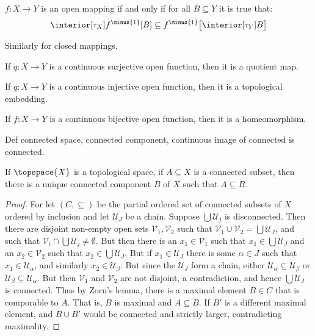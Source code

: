 \documentclass{article}                                                        %
\begin{document}
        \begin{theorem}
            $f:X\rightarrow{Y}$ is an open mapping if and only if for all
            $B\subseteq{Y}$ it is true that:
            \begin{equation}
                \interior[\tau_{X}]{f^{\minus{1}}[B]}\subseteq
                f^{\minus{1}}\big[\interior[\tau_{Y}]{B}\big]
            \end{equation}
        \end{theorem}
        Similarly for closed mappings.
        \begin{theorem}
            If $q:X\rightarrow{Y}$ is a continuous surjective open function,
            then it is a quotient map.
        \end{theorem}
        \begin{theorem}
            If $q:X\rightarrow{Y}$ is a continuous injective open function,
            then it is a topological embedding.
        \end{theorem}
        \begin{theorem}
            If $f:X\rightarrow{Y}$ is a continuous bijective open function,
            then it is a homeomorphism.
        \end{theorem}
        Def connected space, connected component, continuous image of connected
        is connected.
        \begin{theorem}
            If $\topspace{X}$ is a topological space, if $A\subseteq{X}$ is a
            connected subset, then there is a unique connected component
            $B$ of $X$ such that $A\subseteq{B}$.
        \end{theorem}
        \begin{proof}
            For let $(C,\subseteq)$ be the partial ordered set of connected
            subsets of $X$ ordered by inclusion and let $\mathcal{U}_{J}$ be a
            chain. Suppose $\bigcup\mathcal{U}_{j}$ is disconnected. Then there
            are disjoint non-empty open sets $\mathcal{V}_{1},\mathcal{V}_{2}$
            such that
            $\mathcal{V}_{1}\cup\mathcal{V}_{2}=\bigcup\mathcal{U}_{J}$, and
            such that $\mathcal{V}_{i}\cap\bigcup\mathcal{U}_{j}\ne\emptyset$.
            But then there is an $x_{1}\in\mathcal{V}_{1}$ such that
            $x_{1}\in\bigcup\mathcal{U}_{J}$ and an $x_{2}\in\mathcal{V}_{2}$
            such that $x_{2}\in\bigcup\mathcal{U}_{J}$. But if
            $x_{1}\in\mathcal{U}_{J}$ there is some $\alpha\in{J}$ such that
            $x_{1}\in\mathcal{U}_{\alpha}$, and similarly
            $x_{2}\in\mathcal{U}_{\beta}$. But since the $\mathcal{U}_{J}$ form
            a chain, either $\mathcal{U}_{\alpha}\subseteq\mathcal{U}_{\beta}$
            or $\mathcal{U}_{\beta}\subseteq\mathcal{U}_{\alpha}$. But then
            $\mathcal{V}_{1}$ and $\mathcal{V}_{2}$ are not disjoint, a
            contradiction, and hence $\bigcup\mathcal{U}_{J}$ is connected.
            Thus by Zorn's lemma, there is a maximal element $B\in{C}$ that is
            comporable to $A$. That is, $B$ is maximal and $A\subseteq{B}$.
            If $B'$ is a different maximal element, and
            $B\cup{B}'$ would be connected and strictly larger, contradicting
            maximality.
        \end{proof}
\end{document}
